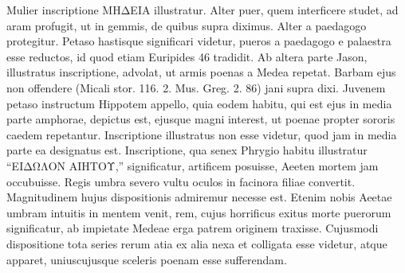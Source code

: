 \documentclass[a4paper, 11pt, oneside, polutonikogreek, german]{article}
\begin{document}
Mulier inscriptione ΜΗΔΕΙΑ illustratur. Alter puer, quem interficere studet, ad aram profugit, ut in gemmis, de quibus supra diximus. Alter a paedagogo protegitur. Petaso hastisque significari videtur, pueros a paedagogo e palaestra esse reductos, id quod etiam Euripides 46 tradidit. Ab altera parte Jason, illustratus inscriptione, advolat, ut armis poenas a Medea repetat. Barbam ejus non offendere (Micali stor. 116. 2. Mus. Greg. 2. 86) jani supra dixi. Juvenem petaso instructum Hippotem appello, quia eodem habitu, qui est ejus in media parte amphorae, depictus est, ejusque magni interest, ut poenae propter sororis caedem repetantur. Inscriptione illustratus non esse videtur, quod jam in media parte ea designatus est. Inscriptione, qua senex Phrygio habitu illustratur "`ΕΙΔΩΛΟΝ ΑΙΗΤΟΥ,"' significatur, artificem posuisse, Aeeten mortem jam occubuisse. Regis umbra severo vultu oculos in facinora filiae convertit. Magnitudinem hujus dispositionis admiremur necesse est. Etenim nobis Aeetae umbram intuitis in mentem venit, rem, cujus horrificus exitus morte puerorum significatur, ab impietate Medeae erga patrem originem traxisse. Cujusmodi dispositione tota series rerum atia ex alia nexa et colligata esse videtur, atque apparet, uniuscujusque sceleris poenam esse sufferendam.
\end{document}
